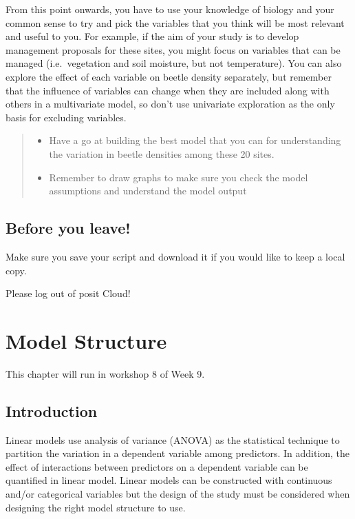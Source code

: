 \documentclass[
]{book}
\providecommand{\tightlist}{%
  \setlength{\itemsep}{0pt}\setlength{\parskip}{0pt}}
\begin{document}
From this point onwards, you have to use your knowledge of biology and your common sense to try and pick the variables that you think will be most relevant and useful to you. For example, if the aim of your study is to develop management proposals for these sites, you might focus on variables that can be managed (i.e.~vegetation and soil moisture, but not temperature). You can also explore the effect of each variable on beetle density separately, but remember that the influence of variables can change when they are included along with others in a multivariate model, so don't use univariate exploration as the only basis for excluding variables.

\begin{quote}
\begin{itemize}
\tightlist
\item
  Have a go at building the best model that you can for understanding the variation in beetle densities among these 20 sites.
\item
  Remember to draw graphs to make sure you check the model assumptions and understand the model output
\end{itemize}
\end{quote}

\hypertarget{before-you-leave-8}{%
\section{Before you leave!}\label{before-you-leave-8}}

Make sure you save your script and download it if you would like to keep a local copy.

Please log out of posit Cloud!

\hypertarget{model-structure}{%
\chapter{Model Structure}\label{model-structure}}

This chapter will run in workshop 8 of Week 9.

\hypertarget{introduction-6}{%
\section{Introduction}\label{introduction-6}}

Linear models use analysis of variance (ANOVA) as the statistical technique to partition the variation in a dependent variable among predictors. In addition, the effect of interactions between predictors on a dependent variable can be quantified in linear model. Linear models can be constructed with continuous and/or categorical variables but the design of the study must be considered when designing the right model structure to use.
\end{document}
